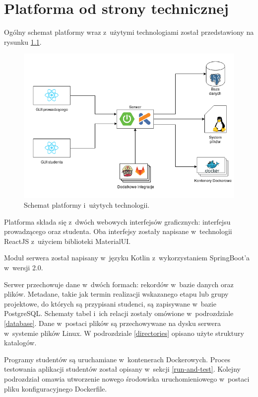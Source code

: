 \chapter{Platforma od strony technicznej}
\label{chapter:platform-technical}
Ogólny schemat platformy wraz z~użytymi technologiami został przedstawiony na rysunku \ref{fig:platform-schema}.

\begin{figure}[h]
    \centering
    \includegraphics[width = 13cm]{chapter05/platform_schema.png}
    \caption{Schemat platformy i~użytych technologii.}
    \label{fig:platform-schema}
\end{figure}

Platforma składa się z~dwóch webowych interfejsów graficznych: interfejsu prowadzącego oraz studenta.
Oba interfejsy zostały napisane w~technologii ReactJS z~użyciem biblioteki MaterialUI.

Moduł serwera został napisany w~języku Kotlin z~wykorzystaniem SpringBoot’a w~wersji 2.0.

Serwer przechowuje dane w~dwóch formach: rekordów w~bazie danych oraz plików.
Metadane, takie jak termin realizacji wskazanego etapu lub grupy projektowe, do których są przypisani studenci, są zapisywane w~bazie PostgreSQL.
Schematy tabel i~ich relacji zostały omówione w~podrozdziale \ref{database}.
Dane w~postaci plików są przechowywane na dysku serwera w~systemie plików Linux.
W podrozdziale \ref{directories} opisano użyte struktury katalogów.

Programy studentów są uruchamiane w~kontenerach Dockerowych.
Proces testowania aplikacji studentów został opisany w~sekcji \ref{run-and-test}.
Kolejny podrozdział omawia utworzenie nowego środowiska uruchomieniowego w~postaci pliku konfiguracyjnego Dockerfile.

